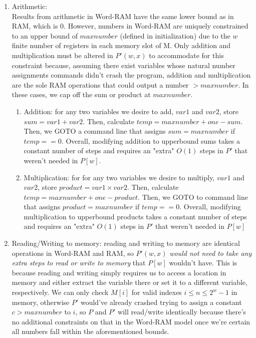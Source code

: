 \documentclass[11pt]{article}
\begin{document}
\begin{enumerate}
\begin{enumerate}
    \item Arithmetic:\\

Results from arithmetic in Word-RAM have the same lower bound as in RAM, which is 0. However, numbers in Word-RAM are uniquely constrained to an upper bound of $maxnumber$ (defined in initialization) due to the $w$ finite number of registers in each memory slot of M. Only addition and multiplication must be altered in $P'(w, x)$ to accommodate for this constraint because, assuming there exist variables whose natural number assignments commands didn't crash the program, addition and multiplication are the sole RAM operations that could output a number $ > maxnumber$. In these cases, we cap off the sum or product at $maxnumber$. \\
    \begin{enumerate}
        \item Addition: for any two variables we desire to add, $var1$ and $var2$, store $sum = var1 + var2$. Then, calculate $temp = maxnumber + one - sum$. Then, we GOTO a command line that assigns $sum = maxnumber$ if $temp == 0$. Overall, modifying addition to upperbound sums takes a constant number of steps and requires an "extra" $O(1)$ steps in $P'$ that weren't needed in $P[w]$. \\
        \item Multiplication: for for any two variables we desire to multiply, $var1$ and $var2$, store $product = var1 \times var2$. Then, calculate $temp = maxnumber + one - product$. Then, we GOTO to command line that assigns $product = maxnumber$ if $temp == 0$. Overall, modifying multiplication to upperbound products takes a constant number of steps and requires an "extra" $O(1)$ steps in $P'$ that weren't needed in $P[w]$ \\
    \end{enumerate}
    
\item Reading/Writing to memory: reading and writing to memory are identical operations in Word-RAM and RAM, so $P'(w, x)$ \textit{would not need to take any extra steps to read or write to memory} that $P[w]$ wouldn't have. This is because reading and writing simply requires us to access a location in memory and either extract the variable there or set it to a different variable, respectively. We can only check $M[i]$ for valid indexes $i \leq n \leq 2^w - 1$ in memory, otherwise $P'$ would've already crashed trying to assign a constant $c > maxnumber$ to $i$, so $P$ and $P'$ will read/write identically because there's no additional constraints on that in the Word-RAM model once we're certain all numbers fall within the aforementioned bounds. \\


\end{enumerate}
\end{enumerate}
\end{document}
